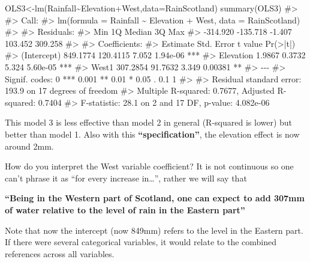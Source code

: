 \documentclass[
  letterpaper,
  DIV=11,
  numbers=noendperiod]{scrreprt}
\newenvironment{Shaded}{\begin{snugshade}}{\end{snugshade}}
\newcommand{\AttributeTok}[1]{\textcolor[rgb]{0.40,0.45,0.13}{#1}}
\newcommand{\CommentTok}[1]{\textcolor[rgb]{0.37,0.37,0.37}{#1}}
\newcommand{\FunctionTok}[1]{\textcolor[rgb]{0.28,0.35,0.67}{#1}}
\newcommand{\NormalTok}[1]{\textcolor[rgb]{0.00,0.23,0.31}{#1}}
\newcommand{\OtherTok}[1]{\textcolor[rgb]{0.00,0.23,0.31}{#1}}
\newcommand{\SpecialCharTok}[1]{\textcolor[rgb]{0.37,0.37,0.37}{#1}}
\begin{document}
\begin{Shaded}
\begin{Highlighting}[]
\NormalTok{OLS3}\OtherTok{\textless{}{-}}\FunctionTok{lm}\NormalTok{(Rainfall}\SpecialCharTok{\textasciitilde{}}\NormalTok{Elevation}\SpecialCharTok{+}\NormalTok{West,}\AttributeTok{data=}\NormalTok{RainScotland)}
\FunctionTok{summary}\NormalTok{(OLS3)}
\CommentTok{\#\textgreater{} }
\CommentTok{\#\textgreater{} Call:}
\CommentTok{\#\textgreater{} lm(formula = Rainfall \textasciitilde{} Elevation + West, data = RainScotland)}
\CommentTok{\#\textgreater{} }
\CommentTok{\#\textgreater{} Residuals:}
\CommentTok{\#\textgreater{}      Min       1Q   Median       3Q      Max }
\CommentTok{\#\textgreater{} {-}314.920 {-}135.718   {-}1.407  103.452  309.258 }
\CommentTok{\#\textgreater{} }
\CommentTok{\#\textgreater{} Coefficients:}
\CommentTok{\#\textgreater{}             Estimate Std. Error t value Pr(\textgreater{}|t|)    }
\CommentTok{\#\textgreater{} (Intercept) 849.1774   120.4115   7.052 1.94e{-}06 ***}
\CommentTok{\#\textgreater{} Elevation     1.9867     0.3732   5.324 5.60e{-}05 ***}
\CommentTok{\#\textgreater{} West1       307.2854    91.7632   3.349  0.00381 ** }
\CommentTok{\#\textgreater{} {-}{-}{-}}
\CommentTok{\#\textgreater{} Signif. codes:  0 \textquotesingle{}***\textquotesingle{} 0.001 \textquotesingle{}**\textquotesingle{} 0.01 \textquotesingle{}*\textquotesingle{} 0.05 \textquotesingle{}.\textquotesingle{} 0.1 \textquotesingle{} \textquotesingle{} 1}
\CommentTok{\#\textgreater{} }
\CommentTok{\#\textgreater{} Residual standard error: 193.9 on 17 degrees of freedom}
\CommentTok{\#\textgreater{} Multiple R{-}squared:  0.7677, Adjusted R{-}squared:  0.7404 }
\CommentTok{\#\textgreater{} F{-}statistic:  28.1 on 2 and 17 DF,  p{-}value: 4.082e{-}06}
\end{Highlighting}
\end{Shaded}

This model 3 is less effective than model 2 in general (R-squared is
lower) but better than model 1. Also with this
\textbf{``specification''}, the elevation effect is now around 2mm.

How do you interpret the West variable coefficient? It is not continuous
so one can't phrase it as ``for every increase in\ldots{}'', rather we
will say that

\textbf{``Being in the Western part of Scotland, one can expect to add
307mm of water relative to the level of rain in the Eastern part''}

Note that now the intercept (now 849mm) refers to the level in the
Eastern part. If there were several categorical variables, it would
relate to the combined references across all variables.
\end{document}
